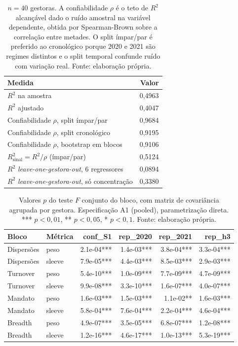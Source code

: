 \begin{table}[h]\centering\small
\caption{O $R^2$ de 0,496 do modelo por gestora: atenuação e desempenho fora da amostra.}
\label{tab:ext-atenuacao}
\begin{tabular}{@{}lr@{}}
\toprule
Medida & Valor \\
\midrule
$R^2$ na amostra & 0,4963 \\
$R^2$ ajustado & 0,4047 \\
\addlinespace
Confiabilidade $\rho$, split ímpar/par & 0,9684 \\
Confiabilidade $\rho$, split cronológico & 0,9195 \\
Confiabilidade $\rho$, bootstrap em blocos & 0,9106 \\
\addlinespace
$R^2_{\text{sinal}} = R^2/\rho$ (ímpar/par) & 0,5124 \\
\addlinespace
$R^2$ \emph{leave-one-gestora-out}, 6 regressores & 0,0894 \\
$R^2$ \emph{leave-one-gestora-out}, só concentração & 0,3380 \\
\bottomrule
\end{tabular}
\caption*{\footnotesize $n=40$ gestoras. A confiabilidade $\rho$ é o teto de $R^2$ alcançável dado o ruído amostral na variável dependente, obtida por Spearman-Brown sobre a correlação entre metades. O split ímpar/par é preferido ao cronológico porque 2020 e 2021 são regimes distintos e o split temporal confunde ruído com variação real. Fonte: elaboração própria.}
\end{table}

\begin{table}[h]\centering\small
\caption{Testes $F$ conjuntos por bloco de variáveis: confirmação e replicações.}
\label{tab:ext-blocos}
\begin{tabular}{@{}llrrrr@{}}
\toprule
Bloco & Métrica & conf\_S1 & rep\_2020 & rep\_2021 & rep\_h3 \\
\midrule
Dispersões & peso & 2.1e-04*** & 1.4e-03*** & 3.8e-04*** & 3.3e-04*** \\
Dispersões & sleeve & 7.9e-05*** & 4.4e-03*** & 8.5e-03*** & 2.9e-03*** \\
Turnover & peso & 5.4e-10*** & 1.0e-09*** & 7.7e-09*** & 4.7e-09*** \\
Turnover & sleeve & 9.9e-08*** & 3.3e-10*** & 1.6e-07*** & 4.0e-07*** \\
Mandato & peso & 1.6e-03*** & 1.5e-03*** & 1.1e-02** & 1.6e-03*** \\
Mandato & sleeve & 5.8e-04*** & 7.6e-04*** & 2.2e-04*** & 4.6e-04*** \\
Breadth & peso & 4.9e-07*** & 3.5e-05*** & 6.8e-07*** & 1.2e-08*** \\
Breadth & sleeve & 1.2e-16*** & 4.6e-17*** & 1.0e-13*** & 5.3e-19*** \\
\bottomrule
\end{tabular}
\caption*{\footnotesize Valores $p$ do teste $F$ conjunto do bloco, com matriz de covariância agrupada por gestora. Especificação A1 (pooled), parametrização direta. *** $p<0{,}01$, ** $p<0{,}05$, * $p<0{,}1$. Fonte: elaboração própria.}
\end{table}

